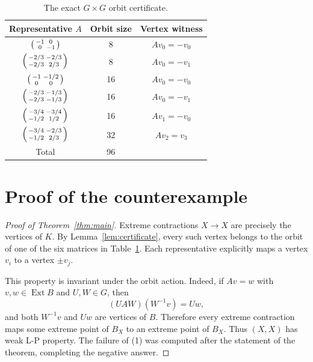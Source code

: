 \documentclass[11pt]{article}
\newcommand{\Ext}{\operatorname{Ext}}
\begin{document}
\begin{table}[H]
\centering
\footnotesize
\renewcommand{\arraystretch}{1.08}
\begin{tabular}{c c c}
\toprule
Representative $A$ & Orbit size & Vertex witness \\
\midrule
$\begin{psmallmatrix}-1&0\\0&-1\end{psmallmatrix}$
& 8 & $Av_0=-v_0$ \\
$\begin{psmallmatrix}-2/3&-2/3\\-2/3&2/3\end{psmallmatrix}$
& 8 & $Av_0=-v_1$ \\
$\begin{psmallmatrix}-1&-1/2\\0&0\end{psmallmatrix}$
& 16 & $Av_0=-v_0$ \\
$\begin{psmallmatrix}-2/3&-1/3\\-2/3&-1/3\end{psmallmatrix}$
& 16 & $Av_0=-v_1$ \\
$\begin{psmallmatrix}-3/4&-3/4\\-1/2&1/2\end{psmallmatrix}$
& 16 & $Av_1=-v_0$ \\
$\begin{psmallmatrix}-3/4&-2/3\\-1/2&2/3\end{psmallmatrix}$
& 32 & $Av_2=v_3$ \\
\midrule
Total & 96 & \\
\bottomrule
\end{tabular}
\caption{The exact $G\times G$ orbit certificate.}
\label{tab:orbits}
\end{table}

\section{Proof of the counterexample}

\begin{proof}[Proof of Theorem~\ref{thm:main}]
Extreme contractions $X\to X$ are precisely the vertices of $K$. By
Lemma~\ref{lem:certificate}, every such vertex belongs to the orbit of one of
the six matrices in Table~\ref{tab:orbits}. Each representative explicitly
maps a vertex $v_i$ to a vertex $\pm v_j$.

This property is invariant under the orbit action. Indeed, if $Av=w$ with
$v,w\in\Ext B$ and $U,W\in G$, then
\[
 (UAW)(W^{-1}v)=Uw,
\]
and both $W^{-1}v$ and $Uw$ are vertices of $B$. Therefore every extreme
contraction maps some extreme point of $B_X$ to an extreme point of $B_X$.
Thus $(X,X)$ has weak L-P property. The failure of (1) was computed after the
statement of the theorem, completing the negative answer.
\end{proof}
\end{document}
